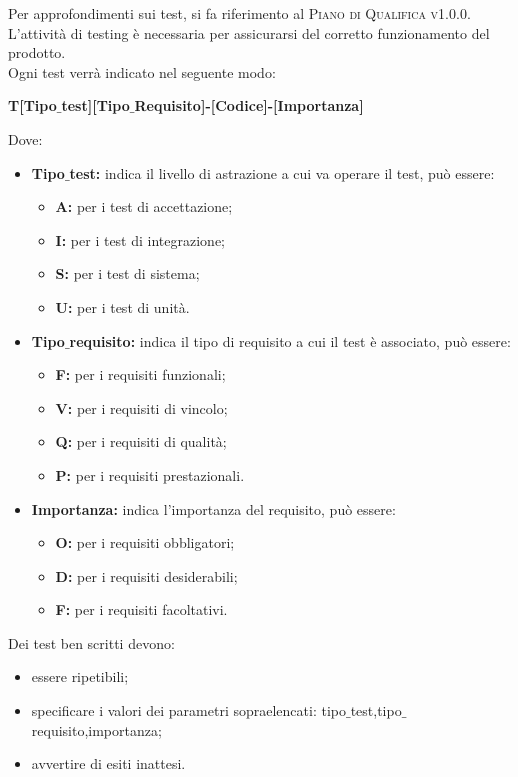     Per approfondimenti sui test, si fa riferimento al \textsc{Piano di Qualifica v1.0.0}.
    L'attività di testing è necessaria per assicurarsi del corretto funzionamento del prodotto.\\Ogni test verrà indicato nel seguente modo:\\
    \begin{center}
    	\textbf{T[Tipo$\_$test][Tipo$\_$Requisito]-[Codice]-[Importanza]}
    \end{center}
    Dove:
    \begin{itemize}
    	\item \textbf{Tipo$\_$test:} indica il livello di astrazione a cui va operare il test, può essere:
    	\begin{itemize}
    		\item \textbf{A:} per i test di accettazione;
    		\item \textbf{I:} per i test di integrazione;
    		\item \textbf{S:} per i test di sistema;
    		\item \textbf{U:} per i test di unità.
    	\end{itemize}
    	\item \textbf{Tipo$\_$requisito:} indica il tipo di requisito a cui il test è associato, può essere:
    	\begin{itemize}
    		\item \textbf{F:} per i requisiti funzionali;
    		\item \textbf{V:} per i requisiti di vincolo;
    		\item \textbf{Q:} per i requisiti di qualità;
    		\item \textbf{P:} per i requisiti prestazionali.
    	\end{itemize}
    	\item \textbf{Importanza:} indica l'importanza del requisito, può essere:
    	\begin{itemize}
    		\item \textbf{O:} per i requisiti obbligatori;
    		\item \textbf{D:} per i requisiti desiderabili;
    		\item \textbf{F:} per i requisiti facoltativi.
    	\end{itemize}
    \end{itemize}
    Dei test ben scritti devono:
    \begin{itemize}
    	\item essere ripetibili;
    	\item specificare i valori dei parametri sopraelencati: tipo$\_$test,tipo$\_$requisito,importanza;
    	\item avvertire di esiti inattesi.
    \end{itemize}
